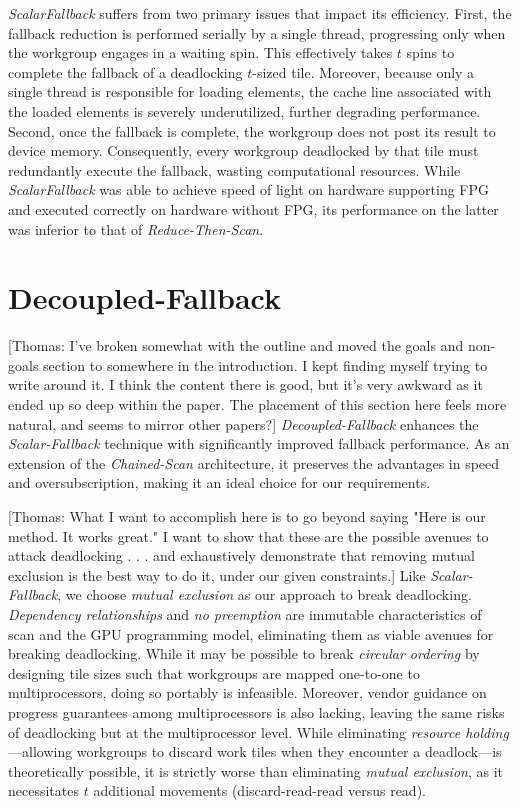 \documentclass[sigconf]{acmart}
\newcommand{\thomas}[1]{{\footnotesize\color{orange}[Thomas: #1]}}
\begin{document}
\emph{ScalarFallback} suffers from two primary issues that impact its efficiency. First, the fallback reduction is performed serially by a single thread, progressing only when the workgroup engages in a waiting spin. This effectively takes $t$ spins to complete the fallback of a deadlocking $t$-sized tile. Moreover, because only a single thread is responsible for loading elements, the cache line associated with the loaded elements is severely underutilized, further degrading performance. Second, once the fallback is complete, the workgroup does not post its result to device memory. Consequently, every workgroup deadlocked by that tile must redundantly execute the fallback, wasting computational resources. While \emph{ScalarFallback} was able to achieve speed of light on hardware supporting FPG and executed correctly on hardware without FPG, its performance on the latter was inferior to that of \emph{Reduce-Then-Scan}.

\section{Decoupled-Fallback}
\thomas{I've broken somewhat with the outline and moved the goals and non-goals section to somewhere in the introduction. I kept finding myself trying to write around it. I think the content there is good, but it's very awkward as it ended up so deep within the paper. The placement of this section here feels more natural, and seems to mirror other papers?}
\emph{Decoupled-Fallback} enhances the \emph{Scalar-Fallback} technique with significantly improved fallback performance. As an extension of the \emph{Chained-Scan} architecture, it preserves the advantages in speed and oversubscription, making it an ideal choice for our requirements.

\thomas{What I want to accomplish here is to go beyond saying "Here is our method. It works great." I want to show that these are the possible avenues to attack deadlocking . . . and exhaustively demonstrate that removing mutual exclusion is the best way to do it, under our given constraints.}
Like \emph{Scalar-Fallback}, we choose \emph{mutual exclusion} as our approach to break deadlocking. \emph{Dependency relationships} and \emph{no preemption} are immutable characteristics of scan and the GPU programming model, eliminating them as viable avenues for breaking deadlocking. While it may be possible to break \emph{circular ordering} by designing tile sizes such that workgroups are mapped one-to-one to multiprocessors, doing so portably is infeasible. Moreover, vendor guidance on progress guarantees among multiprocessors is also lacking, leaving the same risks of deadlocking but at the multiprocessor level. While eliminating \emph{resource holding}---allowing workgroups to discard work tiles when they encounter a deadlock---is theoretically possible, it is strictly worse than eliminating \emph{mutual exclusion}, as it necessitates $t$ additional movements (discard-read-read versus read).
\end{document}
